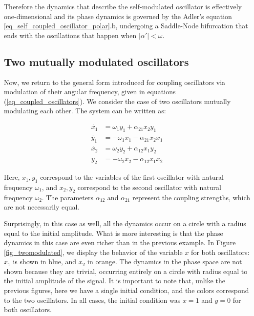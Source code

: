 \documentclass{article}
\begin{document}
Therefore the dynamics that describe the self-modulated oscillator is effectively one-dimensional and its phase dynamics is governed by the Adler's equation \ref{eq_self_coupled_oscillator_polar}.b, undergoing a Saddle-Node bifurcation that ends with the oscillations that happen when $|\alpha'|<\omega$.


\subsection{Two mutually modulated oscillators}

Now, we return to the general form introduced for coupling oscillators via modulation of their angular frequency, given in equations (\ref{eq_coupled_oscillators}). 
We consider the case of two oscillators mutually modulating each other. The system can be written as:


\begin{subequations} \label{eq_twomodulated}
\begin{align}
    \dot{x_1} & = \omega_1 y_1+ \alpha_{21} x_2 y_1 \\
    \dot{y_1} & = -\omega_1 x_1 - \alpha_{21} x_2 x_1 \\
    \dot{x_2} & = \omega_2 y_2+ \alpha_{12} x_1 y_2 \\
    \dot{y_2} & = -\omega_2 x_2 - \alpha_{12} x_1 x_2 
\end{align}
\end{subequations}

Here, $x_1, y_1$ correspond to the variables of the first oscillator with natural frequency $\omega_1$, and $x_2, y_2$ correspond to the second oscillator with natural frequency $\omega_2$. The parameters $\alpha_{12}$ and $\alpha_{21}$ represent the coupling strengths, which are not necessarily equal.

Surprisingly, in this case as well, all the dynamics occur on a circle with a radius equal to the initial amplitude. 
What is more interesting is that the phase dynamics in this case are even richer than in the previous example. 
In Figure \ref{fig_twomodulated}, we display the behavior of the variable $x$ for both oscillators: $x_1$ is shown in blue, and $x_2$ in orange. 
The dynamics in the phase space are not shown because they are trivial, occurring entirely on a circle with 
radius equal to the initial amplitude of the signal. 
It is important to note that, unlike the previous figures, here we have a single initial condition, and the colors correspond to the two oscillators. 
In all cases, the initial condition was $x = 1$ and $y = 0$ for both oscillators.
\end{document}
